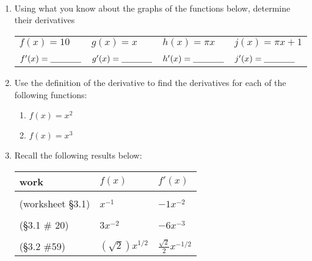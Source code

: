 \documentclass[11pt,fleqn]{article}
\begin{document}
\renewcommand{\headrulewidth}{0pt}
\newcommand{\blank}[1]{\rule{#1}{0.75pt}}
\newcommand{\bc}{\begin{center}}
\newcommand{\ec}{\end{center}}
\renewcommand{\d}{\displaystyle}

\vspace*{-0.7in}

\begin{center}
  \large
  \\
\end{center}
\begin{enumerate}
\item Using what you know about the graphs of the functions below, determine their derivatives\\
	\begin{tabularx}{\textwidth}{XXXX}
	$f(x)=10$&$g(x)=x$&$h(x)=\pi x$&$j(x)=\pi x+1$\\
	&&&\\
	$f'(x)=\underline{\hspace{0.5in}}$&$g'(x)=\underline{\hspace{0.5in}}$&$h'(x)=\underline{\hspace{0.5in}}$&$j'(x)=\underline{\hspace{0.5in}}$\\
	\end{tabularx}
	
\item Use the definition of the derivative to find the derivatives for each of the following functions:
	\begin{enumerate}
	\item $f(x)=x^2$
	\vfill
	\item $f(x)=x^3$
	\vfill
	\end{enumerate}

\vfill
\item Recall the following results below:
\begin{tabular}{l || ll}
work& $f(x)$ &$f'(x)$\\
\hline
&&\\
(worksheet \S 3.1)\quad&$x^{-1}$\quad &$-1x^{-2}$\\
&&\\
(\S 3.1 \# 20) & $3x^{-2}$\quad & $-6x^{-3}$\\
&&\\
(\S 3.2 \#59)&$(\sqrt{2})x^{1/2}$\quad & $\frac{\sqrt{2}}{2}x^{-1/2}$\\
\end{tabular}
\vspace{.5in}


\end{enumerate}
\end{document}

